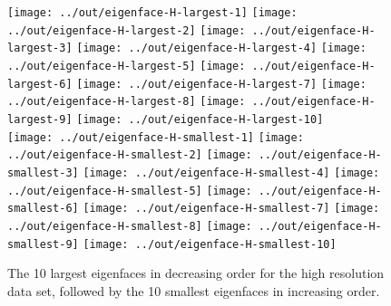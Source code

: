 \documentclass[headings=optiontoheadandtoc,listof=totoc,parskip=full]{scrartcl}
\begin{document}
\begin{figure}[H]
	\centering
	\texttt{[image: ../out/eigenface-H-largest-1]}
	\texttt{[image: ../out/eigenface-H-largest-2]}
	\texttt{[image: ../out/eigenface-H-largest-3]}
	\texttt{[image: ../out/eigenface-H-largest-4]}
	\texttt{[image: ../out/eigenface-H-largest-5]}
	\texttt{[image: ../out/eigenface-H-largest-6]}
	\texttt{[image: ../out/eigenface-H-largest-7]}
	\texttt{[image: ../out/eigenface-H-largest-8]}
	\texttt{[image: ../out/eigenface-H-largest-9]}
	\texttt{[image: ../out/eigenface-H-largest-10]}\\
	\texttt{[image: ../out/eigenface-H-smallest-1]}
	\texttt{[image: ../out/eigenface-H-smallest-2]}
	\texttt{[image: ../out/eigenface-H-smallest-3]}
	\texttt{[image: ../out/eigenface-H-smallest-4]}
	\texttt{[image: ../out/eigenface-H-smallest-5]}
	\texttt{[image: ../out/eigenface-H-smallest-6]}
	\texttt{[image: ../out/eigenface-H-smallest-7]}
	\texttt{[image: ../out/eigenface-H-smallest-8]}
	\texttt{[image: ../out/eigenface-H-smallest-9]}
	\texttt{[image: ../out/eigenface-H-smallest-10]}
	\caption{The 10 largest eigenfaces in decreasing order for the high resolution data set, followed by the 10 smallest eigenfaces in increasing order.}
	\label{fig:largest-eigen-H}
\end{figure}
\end{document}
